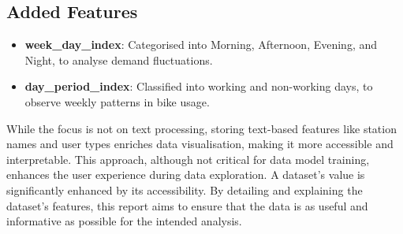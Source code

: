 \subsection{Added Features}\label{subsec:added-features}
\begin{itemize}
    \item \textbf{week\_day\_index}: Categorised into Morning, Afternoon, Evening, and Night, to analyse demand fluctuations.
    \item \textbf{day\_period\_index}: Classified into working and non-working days, to observe weekly patterns in bike usage.
\end{itemize}

While the focus is not on text processing, storing text-based features like station names and user types enriches data visualisation, making it more accessible and interpretable.
This approach, although not critical for data model training, enhances the user experience during data exploration. A dataset's value is significantly enhanced by its accessibility.
By detailing and explaining the dataset's features, this report aims to ensure that the data is as useful and informative as possible for the intended analysis.
